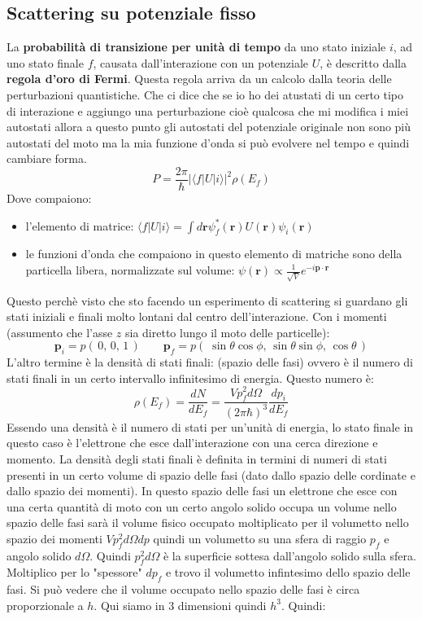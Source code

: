 \subsection{Scattering su potenziale fisso}
La \textbf{probabilità di transizione per unità di tempo} da uno stato iniziale $i$, ad uno stato finale $f$, causata dall'interazione con un potenziale $U$, è descritto dalla \textbf{regola d'oro di Fermi}. Questa regola arriva da un calcolo dalla teoria delle perturbazioni quantistiche. Che ci dice che se io ho dei atustati di un certo tipo di interazione e aggiungo una perturbazione cioè qualcosa che mi modifica i miei autostati allora a questo punto gli autostati del potenziale originale non sono più autostati del moto ma la mia funzione d'onda si può evolvere nel tempo e quindi cambiare forma. 
\begin{equation*}
    P={\frac {2\pi }{\hbar }}\left|\langle f|U|i\rangle \right|^{2}\rho (E_{f})
\end{equation*}
Dove compaiono:
\begin{itemize}
    \item l'elemento di matrice: $\langle f|U|i\rangle=\int d\mathbf{r}\psi^{*}_f(\mathbf{r})U(\mathbf{r})\psi_i(\mathbf{r})$ 
    \item le funzioni d'onda che compaiono in questo elemento di matriche sono della particella libera, normalizzate sul volume: $\psi(\mathbf{r})\propto\frac{1}{\sqrt{V}}e^{-i\mathbf{p}\cdot\mathbf{r}}$
\end{itemize}
Questo perchè visto che sto facendo un esperimento di scattering si guardano gli stati iniziali e finali molto lontani dal centro dell'interazione. Con i momenti (assumento che l'asse $z$ sia diretto lungo il moto delle particelle):
\begin{equation*}
    \mathbf{p}_i=p\left(\,0,\,0,\,1\,\right) \qquad \mathbf{p}_f=p\left(\;\sin\theta\cos\phi,\,\sin\theta\sin\phi,\,\cos\theta\,\right)
\end{equation*}
L'altro termine è la densità di stati finali: (spazio delle fasi) ovvero è il numero di stati finali in un certo intervallo infinitesimo di energia. Questo numero è:
\begin{equation*}
    \rho(E_f)=\frac{dN}{dE_f}=\frac{Vp_f^2d\Omega}{(2\pi\hbar)^3}\frac{dp_i}{dE_f}
\end{equation*}
Essendo una densità è il numero di stati per un'unità di energia, lo stato finale in questo caso è l'elettrone che esce dall'interazione con una cerca direzione e momento. La densità degli stati finali è definita in termini di numeri di stati presenti in un certo volume di spazio delle fasi (dato dallo spazio delle cordinate e dallo spazio dei momenti). In questo spazio delle fasi un elettrone che esce con una certa quantità di moto con un certo angolo solido occupa un volume nello spazio delle fasi sarà il volume fisico occupato moltiplicato per il volumetto nello spazio dei momenti $Vp^2_fd\Omega dp$ quindi un volumetto su una sfera di raggio $p_f$ e angolo solido $d\Omega$. Quindi $p_f^2 d\Omega$ è la superficie sottesa dall'angolo solido sulla sfera. Moltiplico per lo "spessore" $dp_f$ e trovo il volumetto infintesimo dello spazio delle fasi. Si può vedere che il volume occupato nello spazio delle fasi è circa proporzionale a $h$. Qui siamo in 3 dimensioni quindi $h^3$. Quindi:
